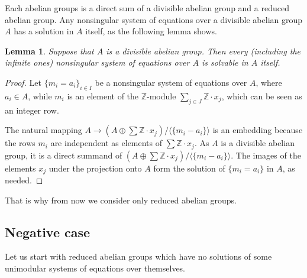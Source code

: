 \documentclass{article}
\newtheorem{lemma}{Lemma}
\theoremstyle{definition}
\theoremstyle{remark}
\begin{document}
Each abelian groups is a direct sum of a divisible
abelian group and a reduced abelian group.
Any nonsingular system of equations over a divisible
abelian group $A$ has a solution in $A$ itself,
as the following lemma shows.

\begin{lemma}\label{divisible}
Suppose that $A$ is a divisible abelian group.
Then every (including the infinite ones)
nonsingular system of equations over $A$
is solvable in $A$ itself.
\end{lemma}
\begin{proof}
Let $\{m_i = a_i\}_{i \in I}$ be
a nonsingular system of equations over $A$,
where $a_i\in A$, while $m_i$ is an element of
the $\mathbb Z$-module
$\sum_{j \in J} \mathbb Z \cdot x_j$,
which can be seen as an integer row. 

The natural mapping
$A \to \left( A\oplus \sum \mathbb Z \cdot x_j \right)
/
\langle \{
m_i - a_i
\} \rangle$
is an embedding because the rows $m_i$ are independent
as elements of $\sum \mathbb Z \cdot x_j$.
As $A$ is a divisible abelian group,
it is a direct summand of
$\left( A\oplus \sum \mathbb Z \cdot x_j \right)
/
\langle \{
m_i - a_i
\} \rangle$.
The images of the elements $x_j$
under the projection onto $A$
form the solution of
$\{m_i=a_i\}$
in $A$, as needed.
\end{proof}

That is why from now we consider only reduced abelian groups.

\subsection{Negative case}

Let us start with reduced abelian groups which
have no solutions of some unimodular systems of equations over themselves.
\end{document}
